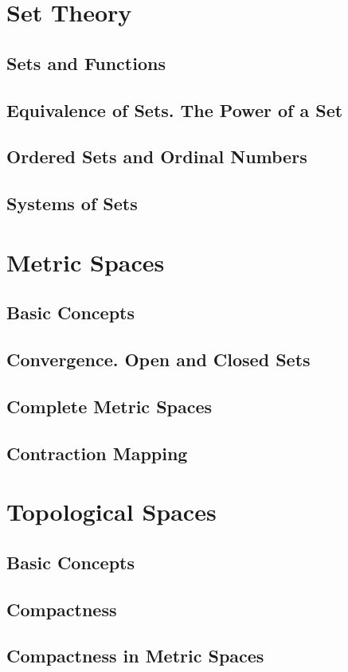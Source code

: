 \documentclass[12pt]{article}
\begin{document}
\section{Set Theory}
\subsection{Sets and Functions}
\subsection{Equivalence of Sets. The Power of a Set}
\subsection{Ordered Sets and Ordinal Numbers}
\subsection{Systems of Sets}

\section{Metric Spaces}
\subsection{Basic Concepts}
\subsection{Convergence. Open and Closed Sets}
\subsection{Complete Metric Spaces}
\subsection{Contraction Mapping}

\section{Topological Spaces}
\subsection{Basic Concepts}
\subsection{Compactness}
\subsection{Compactness in Metric Spaces }
\end{document}
